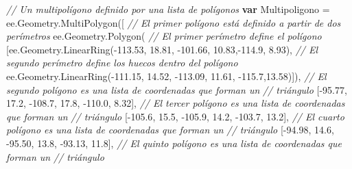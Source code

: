 \documentclass[
  12pt,
  letterpaper,
  twoside]{book}
\newenvironment{Shaded}{\begin{snugshade}}{\end{snugshade}}
\newcommand{\AttributeTok}[1]{\textcolor[rgb]{0.48,0.12,0.64}{#1}}
\newcommand{\CommentTok}[1]{\textcolor[rgb]{0.24,0.58,0.00}{\textit{#1}}}
\newcommand{\FloatTok}[1]{\textcolor[rgb]{0.28,0.53,0.93}{#1}}
\newcommand{\FunctionTok}[1]{\textcolor[rgb]{0.48,0.12,0.64}{#1}}
\newcommand{\KeywordTok}[1]{\textcolor[rgb]{0.00,0.00,0.00}{\textbf{#1}}}
\newcommand{\NormalTok}[1]{#1}
\newcommand{\OperatorTok}[1]{\textcolor[rgb]{0.00,0.00,0.00}{#1}}
\begin{document}
\begin{Shaded}
\begin{Highlighting}[]
\CommentTok{// Un multipolígono definido por una lista de polígonos}
\KeywordTok{var}\NormalTok{ Multipoligono }\OperatorTok{=}\NormalTok{ ee}\OperatorTok{.}\AttributeTok{Geometry}\OperatorTok{.}\FunctionTok{MultiPolygon}\NormalTok{([}
    \CommentTok{// El primer polígono está definido a partir de dos perímetros}
\NormalTok{    ee}\OperatorTok{.}\AttributeTok{Geometry}\OperatorTok{.}\FunctionTok{Polygon}\NormalTok{(  }
    \CommentTok{// El primer perímetro define el polígono                }
\NormalTok{      [ee}\OperatorTok{.}\AttributeTok{Geometry}\OperatorTok{.}\FunctionTok{LinearRing}\NormalTok{(}\OperatorTok{{-}}\FloatTok{113.53}\OperatorTok{,} \FloatTok{18.81}\OperatorTok{,} \OperatorTok{{-}}\FloatTok{101.66}\OperatorTok{,} \FloatTok{10.83}\OperatorTok{,{-}}\FloatTok{114.9}\OperatorTok{,} \FloatTok{8.93}\NormalTok{)}\OperatorTok{,}    
      \CommentTok{// El segundo perímetro define los huecos dentro del polígono}
\NormalTok{    ee}\OperatorTok{.}\AttributeTok{Geometry}\OperatorTok{.}\FunctionTok{LinearRing}\NormalTok{(}\OperatorTok{{-}}\FloatTok{111.15}\OperatorTok{,} \FloatTok{14.52}\OperatorTok{,} \OperatorTok{{-}}\FloatTok{113.09}\OperatorTok{,} \FloatTok{11.61}\OperatorTok{,} \OperatorTok{{-}}\FloatTok{115.7}\OperatorTok{,}\FloatTok{13.58}\NormalTok{)])}\OperatorTok{,}
    \CommentTok{// El segundo polígono es una lista de coordenadas que forman un }
    \CommentTok{// triángulo}
\NormalTok{    [}\OperatorTok{{-}}\FloatTok{95.77}\OperatorTok{,} \FloatTok{17.2}\OperatorTok{,}
     \OperatorTok{{-}}\FloatTok{108.7}\OperatorTok{,} \FloatTok{17.8}\OperatorTok{,}
     \OperatorTok{{-}}\FloatTok{110.0}\OperatorTok{,} \FloatTok{8.32}\NormalTok{]}\OperatorTok{,}
    \CommentTok{// El tercer polígono es una lista de coordenadas que forman un }
    \CommentTok{// triángulo}
\NormalTok{    [}\OperatorTok{{-}}\FloatTok{105.6}\OperatorTok{,} \FloatTok{15.5}\OperatorTok{,}                
     \OperatorTok{{-}}\FloatTok{105.9}\OperatorTok{,} \FloatTok{14.2}\OperatorTok{,}
     \OperatorTok{{-}}\FloatTok{103.7}\OperatorTok{,} \FloatTok{13.2}\NormalTok{]}\OperatorTok{,}
    \CommentTok{// El cuarto polígono es una lista de coordenadas que forman un }
    \CommentTok{// triángulo}
\NormalTok{    [}\OperatorTok{{-}}\FloatTok{94.98}\OperatorTok{,} \FloatTok{14.6}\OperatorTok{,}         
     \OperatorTok{{-}}\FloatTok{95.50}\OperatorTok{,} \FloatTok{13.8}\OperatorTok{,}
     \OperatorTok{{-}}\FloatTok{93.13}\OperatorTok{,} \FloatTok{11.8}\NormalTok{]}\OperatorTok{,}
    \CommentTok{// El quinto polígono es una lista de coordenadas que forman un }
    \CommentTok{// triángulo}

\end{Highlighting}
\end{Shaded}
\end{document}
